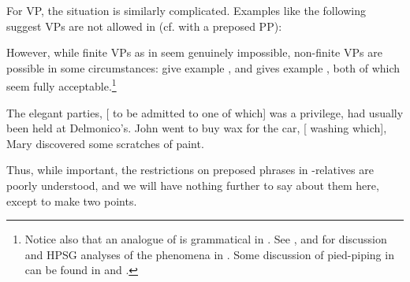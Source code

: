 \documentclass[output=paper
 	        ,biblatex
                ,babelshorthands
                ,newtxmath
                ,draftmode
                ,colorlinks, citecolor=brown
]{langscibook}
\begin{document}
For VP, the situation is similarly complicated. Examples like the following suggest VPs
are not allowed in  (cf.  with a preposed PP):
\begin{exe}\ex\begin{xlist}
    \label{x:rc-26}
    \label{x:rc-27}
    \label{x:rc-281}
    \label{x:rc-291}
  \end{xlist}
\end{exe}
However, while finite VPs as in  seem genuinely impossible, non-finite VPs
are possible in some circumstances: \citet[311]{NanniStillings78} give example
, and \citet[399]{Ishihara84} gives example , both of which
seem fully acceptable.\footnote{Notice also that an analogue of  is
  grammatical in . See ,  and 
  for discussion and HPSG analyses of the phenomena in . Some discussion of
  pied-piping in  can be found in  and .}
\begin{exe}\ex\begin{xlist}
    \ex\label{x:rc-236} The elegant parties, [ to be admitted to one of which] was a privilege,
    had usually been held at Delmonico's. 
    \ex\label{x:rc-237} John went to buy wax for the car, [ washing which], Mary
    discovered some scratches of paint. 
  \end{xlist}
\end{exe}

\noindent
Thus, while important, the restrictions on preposed phrases in -relatives are
poorly understood, and we will have nothing further to say about them here, except to make
two points.
\end{document}

